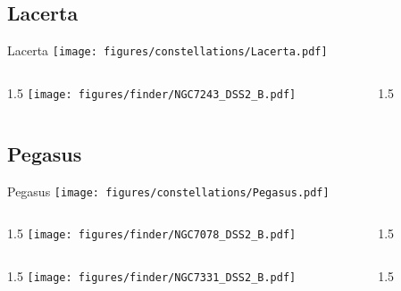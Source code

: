 \documentclass[final]{beamer}
\newlength{\colwidth}
\begin{document}
\subsection{Lacerta}

\begin{frame}[t]{\LARGE Lacerta}
  \centering
  \texttt{[image: figures/constellations/Lacerta.pdf]}
\end{frame}


\begin{frame}[t]{}
  \begin{columns}[T]
    \begin{column}{1.5\colwidth}
      \centering
      \texttt{[image: figures/finder/NGC7243\_DSS2\_B.pdf]}
    \end{column}
    \begin{column}{1.5\colwidth}
      \Large
      
    \end{column}
  \end{columns}
  \vspace{\fill}
\end{frame}

\subsection{Pegasus}

\begin{frame}[t]{\LARGE Pegasus}
  \centering
  \texttt{[image: figures/constellations/Pegasus.pdf]}
\end{frame}


\begin{frame}[t]{}
  \begin{columns}[T]
    \begin{column}{1.5\colwidth}
      \centering
      \texttt{[image: figures/finder/NGC7078\_DSS2\_B.pdf]}
    \end{column}
    \begin{column}{1.5\colwidth}
      \Large
      
    \end{column}
  \end{columns}
  \vspace{\fill}
  \begin{columns}[T]
    \begin{column}{1.5\colwidth}
      \centering
      \texttt{[image: figures/finder/NGC7331\_DSS2\_B.pdf]}
    \end{column}
    \begin{column}{1.5\colwidth}
      \Large
      
    \end{column}
  \end{columns}
\end{frame}
\end{document}
